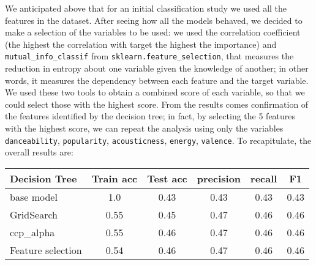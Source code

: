 We anticipated above that for an initial classification study we used all the features in the dataset. After seeing how all the models behaved, we decided to make a selection of the variables to be used: we used the correlation coefficient (the highest the correlation with target the highest the importance) and \texttt{mutual\_info\_classif} from \texttt{sklearn.feature\_selection}, that measures the reduction in entropy about one variable given the knowledge of another; in other words, it measures the dependency between each feature and the target variable. We used these two tools to obtain a combined score of each variable, so that we could select those with the highest score. From the results comes confirmation of the features identified by the decision tree; in fact, by selecting the 5 features with the highest score, we can repeat the analysis using only the variables \texttt{danceability}, \texttt{popularity}, \texttt{acousticness}, \texttt{energy}, \texttt{valence}. To recapitulate, the overall results are:
\begin{table}[H]
\centering
\footnotesize
\begin{tabular}{|l|c|c|c|c|c|}
\hline
\rowcolor[HTML]{036400} 
{\color[HTML]{FFFFFF} Decision Tree}      & {\color[HTML]{FFFFFF} Train acc} & {\color[HTML]{FFFFFF} Test acc} & {\color[HTML]{FFFFFF} precision} & {\color[HTML]{FFFFFF} recall} & {\color[HTML]{FFFFFF} F1} \\ \hline
\cellcolor[HTML]{C0C0C0}base model        & 1.0                              & 0.43                            & 0.43                             & 0.43                          & 0.43                      \\ \hline
\cellcolor[HTML]{C0C0C0}GridSearch        & 0.55                             & 0.45                            & 0.47                             & 0.46                          & 0.46                      \\ \hline
\cellcolor[HTML]{C0C0C0}ccp\_alpha        & 0.55                             & 0.46                            & 0.47                             & 0.46                          & 0.46                      \\ \hline
\cellcolor[HTML]{C0C0C0}Feature selection & 0.54                             & 0.46                            & 0.47                             & 0.46                          & 0.46                      \\ \hline
\end{tabular}
\end{table}
